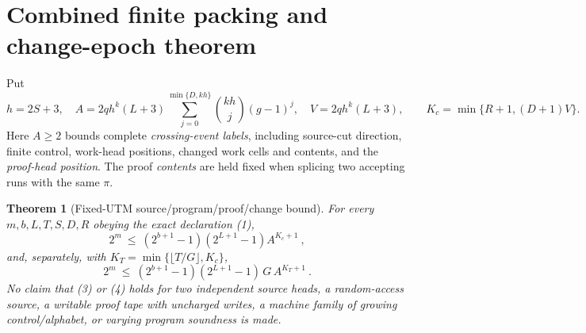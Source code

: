 \documentclass[11pt]{article}
\newtheorem{theorem}{Theorem}
\begin{document}
\section{Combined finite packing and change-epoch theorem}
Put
\[
 h=2S+3,\quad
 A=2q h^k(L+3)
 \sum_{j=0}^{\min\{D,kh\}}
 \binom{kh}{j}(g-1)^j,\quad
 V=2q h^k(L+3),
 \qquad
 K_c=\min\{R+1,(D+1)V\}.
\tag{2}
\]
Here $A\ge2$ bounds complete \emph{crossing-event labels}, including
source-cut direction, finite control, work-head positions, changed work
cells and contents, and the \emph{proof-head position}. The proof
\emph{contents} are held fixed when splicing two accepting runs
with the same $\pi$.

\begin{theorem}[Fixed-UTM source/program/proof/change bound]\label{th:combined}
For every $m,b,L,T,S,D,R$ obeying the exact declaration (1),
\[
\boxed{\
2^m\ \le\ (2^{b+1}-1)(2^{L+1}-1)
 A^{K_c+1}\ },
\tag{3}
\]
and, separately, with $K_T=\min\{\lfloor T/G\rfloor,K_c\}$,
\[
\boxed{\
2^m\ \le\ (2^{b+1}-1)(2^{L+1}-1)\,
G\,A^{K_T+1}\ }. \tag{4}
\]
No claim that (3) or (4) holds for two independent \emph{source}
heads, a random-access source, a writable proof tape with uncharged
writes, a machine family of growing control/alphabet, or varying
program soundness is made.
\end{theorem}
\end{document}
